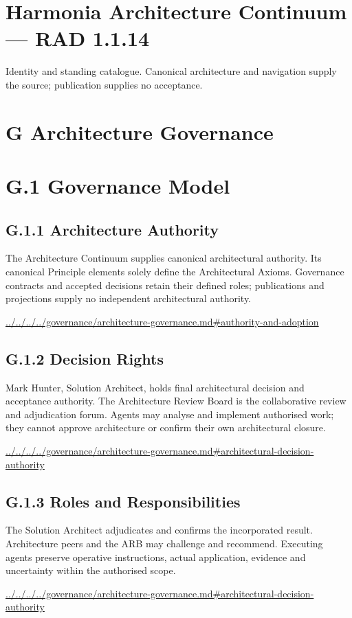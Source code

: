 \documentclass[10pt,a4paper]{article}
\begin{document}
\section*{Harmonia Architecture Continuum — RAD 1.1.14}
Identity and standing catalogue. Canonical architecture and navigation supply the source; publication supplies no acceptance.\par
\section*{G Architecture Governance}
\section*{G.1 Governance Model}
\subsection*{G.1.1 Architecture Authority}
The Architecture Continuum supplies canonical architectural authority. Its canonical Principle elements solely define the Architectural Axioms. Governance contracts and accepted decisions retain their defined roles; publications and projections supply no independent architectural authority.\par
{\footnotesize\url{../../../../governance/architecture-governance.md#authority-and-adoption}}\par
\subsection*{G.1.2 Decision Rights}
Mark Hunter, Solution Architect, holds final architectural decision and acceptance authority. The Architecture Review Board is the collaborative review and adjudication forum. Agents may analyse and implement authorised work; they cannot approve architecture or confirm their own architectural closure.\par
{\footnotesize\url{../../../../governance/architecture-governance.md#architectural-decision-authority}}\par
\subsection*{G.1.3 Roles and Responsibilities}
The Solution Architect adjudicates and confirms the incorporated result. Architecture peers and the ARB may challenge and recommend. Executing agents preserve operative instructions, actual application, evidence and uncertainty within the authorised scope.\par
{\footnotesize\url{../../../../governance/architecture-governance.md#architectural-decision-authority}}\par
\end{document}
